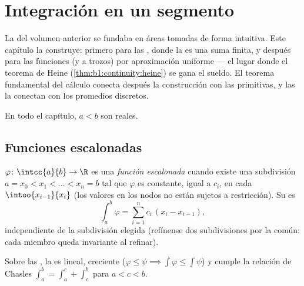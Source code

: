 \chapter{Integración en un segmento}\label{ch:b1:integration}

La  del volumen anterior se fundaba en áreas tomadas de forma
intuitiva. Este capítulo la construye: primero para las , donde la  es una suma finita, y después para las
funciones  (y  a trozos) por aproximación
uniforme --- el lugar donde el teorema de Heine
(\cref{thm:b1:continuity:heine}) se gana el sueldo. El teorema
fundamental del cálculo conecta después la construcción con las
primitivas, y las  la conectan con los promedios
discretos.

En todo el capítulo, $a < b$ son reales.

\section{Funciones escalonadas}

\begin{definition}\label{def:b1:integration:step}
$\varphi \colon \intcc{a}{b} \to \R$ es una \emph{función
escalonada} cuando existe una subdivisión
$a = x_0 < x_1 < \dots < x_n = b$ tal que $\varphi$ es constante,
igual a $c_i$, en cada   $\intoo{x_{i-1}}{x_i}$ (los
valores en los nodos no están sujetos a restricción). Su  es
\[
\int_a^b \varphi = \sum_{i=1}^{n} c_i\,(x_i - x_{i-1}),
\]
independiente de la subdivisión elegida (refínense dos subdivisiones
por la común: cada miembro queda invariante al refinar).
\end{definition}

\begin{proposition}\label{prop:b1:integration:stepprops}
Sobre las , la  es lineal, creciente
($\varphi \leq \psi \implies \int\varphi \leq \int\psi$) y cumple la
relación de Chasles $\int_a^b = \int_a^c + \int_c^b$ para $a < c < b$.
\end{proposition}

